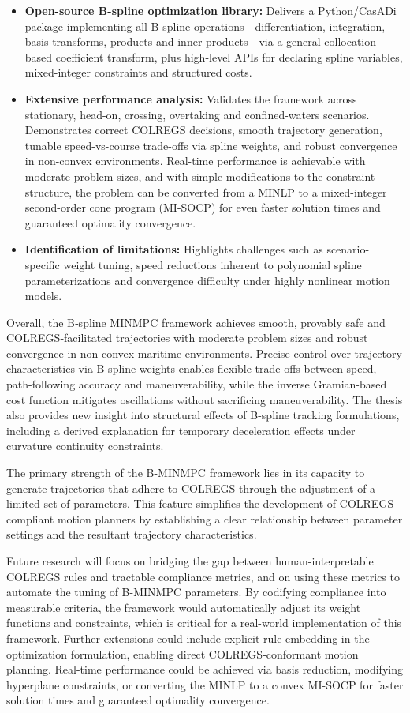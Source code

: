 \begin{itemize}
    \item \textbf{Open-source B-spline optimization library:}  Delivers a Python/CasADi package implementing all B-spline operations---differentiation, integration, basis transforms, products and inner products---via a general collocation-based coefficient transform, plus high-level APIs for declaring spline variables, mixed-integer constraints and structured costs.

    \item \textbf{Extensive performance analysis:}  Validates the framework across stationary, head-on, crossing, overtaking and confined-waters scenarios. Demonstrates correct COLREGS decisions, smooth trajectory generation, tunable speed-vs-course trade-offs via spline weights, and robust convergence in non-convex environments. Real-time performance is achievable with moderate problem sizes, and with simple modifications to the constraint structure, the problem can be converted from a MINLP to a mixed-integer second-order cone program (MI-SOCP) for even faster solution times and guaranteed optimality convergence.

    \item \textbf{Identification of limitations:}  Highlights challenges such as scenario-specific weight tuning, speed reductions inherent to polynomial spline parameterizations and convergence difficulty under highly nonlinear motion models. 
\end{itemize}


Overall, the B‐spline MINMPC framework achieves smooth, provably safe and COLREGS‐facilitated trajectories with moderate problem sizes and robust convergence in non-convex maritime environments. Precise control over trajectory characteristics via B-spline weights enables flexible trade-offs between speed, path-following accuracy and maneuverability, while the inverse Gramian-based cost function mitigates oscillations without sacrificing maneuverability. 
The thesis also provides new insight into structural effects of B-spline tracking formulations, including a derived explanation for temporary deceleration effects under curvature continuity 
constraints.

The primary strength of the B-MINMPC framework lies in its capacity to generate trajectories that adhere to COLREGS through the adjustment of a limited set of parameters. This feature simplifies the development of COLREGS-compliant motion planners by establishing a clear relationship between parameter settings and the resultant trajectory characteristics. 

Future research will focus on bridging the gap between human-interpretable COLREGS rules and tractable compliance metrics, and on using these metrics to automate the tuning of B-MINMPC parameters. By codifying compliance into measurable criteria, the framework would automatically adjust its weight functions and constraints, which is critical for a real-world implementation of this framework.
Further extensions could include explicit rule-embedding in the optimization formulation, enabling direct COLREGS-conformant motion planning. Real-time performance could be achieved via basis reduction, modifying hyperplane constraints, or converting the MINLP to a convex MI-SOCP for faster solution times and guaranteed optimality convergence.